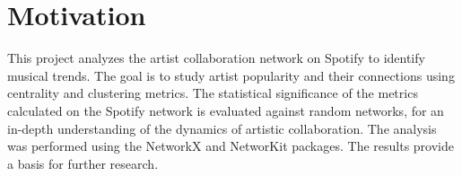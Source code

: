\section{Motivation}
This project analyzes the artist collaboration network on Spotify to identify musical trends. 
The goal is to study artist popularity and their connections using centrality and clustering metrics. 
 The statistical significance of the metrics calculated on the Spotify network is evaluated against random networks, for an in-depth understanding of the dynamics of artistic collaboration. 
 The analysis was performed using the NetworkX and NetworKit packages. The results provide a basis for further research.
